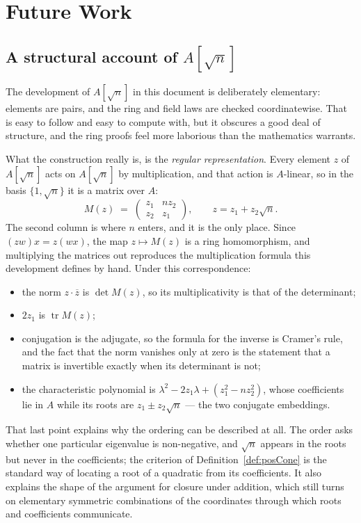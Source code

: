 \chapter{Future Work}

\section{A structural account of $A[\sqrt{n}]$}

The development of $A[\sqrt{n}]$ in this document is deliberately elementary:
elements are pairs, and the ring and field laws are checked coordinatewise. That
is easy to follow and easy to compute with, but it obscures a good deal of
structure, and the ring proofs feel more laborious than the mathematics
warrants.

What the construction really is, is the \emph{regular representation}. Every
element $z$ of $A[\sqrt{n}]$ acts on $A[\sqrt{n}]$ by multiplication, and that
action is $A$-linear, so in the basis $\{1, \sqrt{n}\}$ it is a matrix over $A$:
\begin{displaymath}
  M(z) \;=\;
  \begin{pmatrix} z_1 & n z_2 \\ z_2 & z_1 \end{pmatrix},
  \qquad z = z_1 + z_2\sqrt{n}.
\end{displaymath}
The second column is where $n$ enters, and it is the only place. Since
$(zw)x = z(wx)$, the map $z \mapsto M(z)$ is a ring homomorphism, and
multiplying the matrices out reproduces the multiplication formula this
development defines by hand. Under this correspondence:
\begin{itemize}
\item the norm $z \cdot \overline{z}$ is $\det M(z)$, so its multiplicativity is
      that of the determinant;
\item $2z_1$ is $\operatorname{tr} M(z)$;
\item conjugation is the adjugate, so the formula for the inverse is Cramer's
      rule, and the fact that the norm vanishes only at zero is the statement
      that a matrix is invertible exactly when its determinant is not;
\item the characteristic polynomial is
      $\lambda^2 - 2z_1\lambda + (z_1^2 - n z_2^2)$, whose coefficients lie in
      $A$ while its roots are $z_1 \pm z_2\sqrt{n}$ --- the two conjugate
      embeddings.
\end{itemize}

That last point explains why the ordering can be described at all. The order
asks whether one particular eigenvalue is non-negative, and $\sqrt{n}$ appears
in the roots but never in the coefficients; the criterion of
Definition~\ref{def:posCone} is the standard way of locating a root of a
quadratic from its coefficients. It also explains the shape of the argument for
closure under addition, which still turns on elementary symmetric combinations
of the coordinates through which roots and coefficients communicate. 

